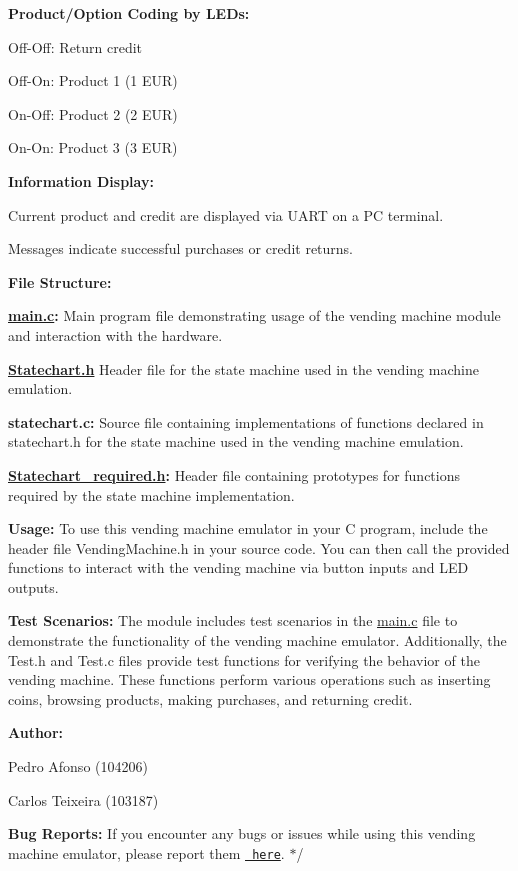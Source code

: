 \begin{DoxyItemize}
\item {\bfseries{Product/\+Option Coding by LEDs\+:}}
\begin{DoxyItemize}
\item Off-\/\+Off\+: Return credit
\item Off-\/\+On\+: Product 1 (1 EUR)
\item On-\/\+Off\+: Product 2 (2 EUR)
\item On-\/\+On\+: Product 3 (3 EUR)
\end{DoxyItemize}
\item {\bfseries{Information Display\+:}}
\begin{DoxyItemize}
\item Current product and credit are displayed via UART on a PC terminal.
\item Messages indicate successful purchases or credit returns.
\end{DoxyItemize}
\end{DoxyItemize}

{\bfseries{File Structure\+:}}
\begin{DoxyItemize}
\item {\bfseries{\mbox{\hyperlink{main_8c}{main.\+c}}\+:}} Main program file demonstrating usage of the vending machine module and interaction with the hardware.
\item {\bfseries{\mbox{\hyperlink{Statechart_8h}{Statechart.\+h}}}} Header file for the state machine used in the vending machine emulation.
\item {\bfseries{statechart.\+c\+:}} Source file containing implementations of functions declared in statechart.\+h for the state machine used in the vending machine emulation.
\item {\bfseries{\mbox{\hyperlink{Statechart__required_8h}{Statechart\+\_\+required.\+h}}\+:}} Header file containing prototypes for functions required by the state machine implementation.
\end{DoxyItemize}

{\bfseries{Usage\+:}} To use this vending machine emulator in your C program, include the header file Vending\+Machine.\+h in your source code. You can then call the provided functions to interact with the vending machine via button inputs and LED outputs.

{\bfseries{Test Scenarios\+:}} The module includes test scenarios in the \mbox{\hyperlink{main_8c}{main.\+c}} file to demonstrate the functionality of the vending machine emulator. Additionally, the Test.\+h and Test.\+c files provide test functions for verifying the behavior of the vending machine. These functions perform various operations such as inserting coins, browsing products, making purchases, and returning credit.

{\bfseries{Author\+:}}
\begin{DoxyItemize}
\item Pedro Afonso (104206)
\item Carlos Teixeira (103187)
\end{DoxyItemize}

{\bfseries{Bug Reports\+:}} If you encounter any bugs or issues while using this vending machine emulator, please report them \href{https://github.com/pisko19/SETR/issues}{\texttt{ here}}. $\ast$/ 